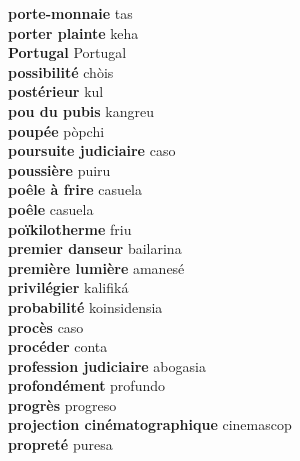\textbf{ porte-monnaie  } tas \\
\textbf{ porter plainte  } keha \\
\textbf{ Portugal  } Portugal \\
\textbf{ possibilité  } chòis \\
\textbf{ postérieur  } kul \\
\textbf{ pou du pubis  } kangreu \\
\textbf{ poupée  } pòpchi \\
\textbf{ poursuite judiciaire  } caso \\
\textbf{ poussière  } puiru \\
\textbf{ poêle à frire  } casuela \\
\textbf{ poêle  } casuela \\
\textbf{ poïkilotherme  } friu \\
\textbf{ premier danseur  } bailarina \\
\textbf{ première lumière  } amanesé \\
\textbf{ privilégier  } kalifiká \\
\textbf{ probabilité  } koinsidensia \\
\textbf{ procès  } caso \\
\textbf{ procéder  } conta \\
\textbf{ profession judiciaire  } abogasia \\
\textbf{ profondément  } profundo \\
\textbf{ progrès  } progreso \\
\textbf{ projection cinématographique  } cinemascop \\
\textbf{ propreté  } puresa \\
